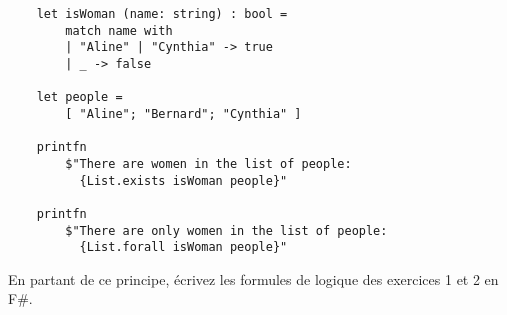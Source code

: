 \documentclass[a4paper, titlepage]{article}
\numberwithin{figure}{section}
\numberwithin{table}{section}
\begin{document}
    \begin{lstlisting}
    let isWoman (name: string) : bool =
        match name with
        | "Aline" | "Cynthia" -> true
        | _ -> false

    let people =
        [ "Aline"; "Bernard"; "Cynthia" ]

    printfn 
        $"There are women in the list of people:
          {List.exists isWoman people}"

    printfn
        $"There are only women in the list of people: 
          {List.forall isWoman people}"
    \end{lstlisting}

    En partant de ce principe, écrivez les formules de logique des exercices 1 et 2 en F\#.
\end{document}
